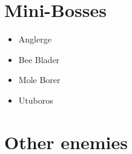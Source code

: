 \section{Mini-Bosses}
	\begin{itemize}
		\item \hypertarget{miniboss:Anglerge}{Anglerge}
		\item \hypertarget{miniboss:Bee_Blader}{Bee Blader}
		\item \hypertarget{subboss:Mole Borer}{Mole Borer}
		\item \hypertarget{miniboss:Utuboros}{Utuboros}
	\end{itemize}

\section{Other enemies}
